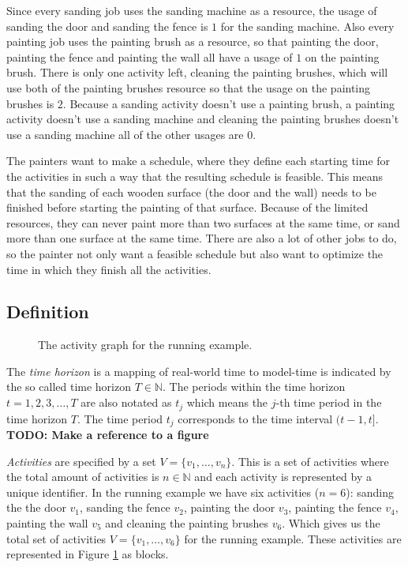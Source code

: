 \documentclass{article}
\theoremstyle{definition}
\newcommand{\TODO}[1]{{\color{red}\textbf{TODO: #1}}}
\begin{document}
Since every sanding job uses the sanding machine as a resource, the usage of sanding the door and sanding the fence is $1$ for the sanding machine.
Also every painting job uses the painting brush as a resource, so that painting the door, painting the fence and painting the wall all have a usage of $1$ on the painting brush.
There is only one activity left, cleaning the painting brushes, which will use both of the painting brushes resource so that the usage on the painting brushes is $2$.
Because a sanding activity doesn't use a painting brush, a painting activity doesn't use a sanding machine and cleaning the painting brushes doesn't use a sanding machine all of the other usages are $0$.

The painters want to make a schedule, where they define each starting time for the activities in such a way that the resulting schedule is feasible.
This means that the sanding of each wooden surface (the door and the wall) needs to be finished before starting the painting of that surface.
Because of the limited resources, they can never paint more than two surfaces at the same time, or sand more than one surface at the same time.
There are also a lot of other jobs to do, so the painter not only want a feasible schedule but also want to optimize the time in which they finish all the activities.

\subsection{Definition}
\label{text:definitions}

\begin{figure}[h]
	\centering
	
	\caption{The activity graph for the running example. }
	\label{fig:activity_graph}
\end{figure}

The \emph{time horizon} is a mapping of real-world time to model-time is indicated by the so called time horizon $T \in \mathbb{N}$.
The periods within the time horizon $t=1,2,3,\ldots,T$ are also notated as $t_j$ which means the $j$-th time period in the time horizon $T$. 
The time period $t_j$ corresponds to the time interval $(t-1,t]$. 
\TODO{Make a reference to a figure}

\emph{Activities} are specified by a set $V = \{v_1, \ldots, v_n\}$.
This is a set of activities where the total amount of activities is $n \in \mathbb{N}$ and each activity is represented by a unique identifier. %
In the running example we have six activities ($n = 6$): sanding the the door $v_1$, sanding the fence $v_2$,  painting the door $v_3$, painting the fence $v_4$, painting the wall $v_5$ and cleaning the painting brushes $v_6$.
Which gives us the total set of activities $V = \{v_1, \ldots, v_6\}$ for the running example.
These activities are represented in Figure \ref{fig:activity_graph} as blocks.
\end{document}

